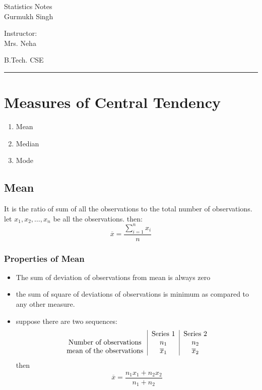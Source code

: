 \documentclass[11pt,letterpaper]{article}
\begin{document}
\begin{center}
  \Huge{Statistics Notes}\\
  \vspace{0.25cm}
  \small{Gurmukh Singh}
\end{center}

\vspace{-1.75cm}

\begin{flushright}
  Instructor: \\ Mrs. Neha
\end{flushright}

\vspace{-1.3cm}

\begin{flushleft}
  B.Tech. CSE
\end{flushleft}

\rule{15.5cm}{0.1mm}%



\section{Measures of Central Tendency}
\begin{enumerate}
  \item Mean
  \item Median
  \item Mode
\end{enumerate}

\subsection{Mean}
It is the ratio of sum of all the observations to the total number of observations.
let $x_1, x_2, \dots, x_n$ be all the observations. then:
\[
  \overline{x} =\frac{\sum_{i=1}^n x_i}{n}
\]

\subsubsection{Properties of Mean}
\begin{itemize}
  \item The sum of deviation of observations from mean is always zero
  \item the sum of square of deviations of observations is minimum as compared to any other measure.
  \item suppose there are two sequences:
    \[
      \begin{tabular}{c|c|c}
        & Series 1 & Series 2 \\ 
        Number of observations & $n_1$ & $n_2$ \\ 
        mean of the observations & $\overline{x}_1 $& $\overline{x}_2$
      \end{tabular} 
    \]
    then
    \[
      \overline{x} = \frac{n_1x_1+n_2x_2}{n_1+n_2}
    \]
\end{itemize}
\end{document}
